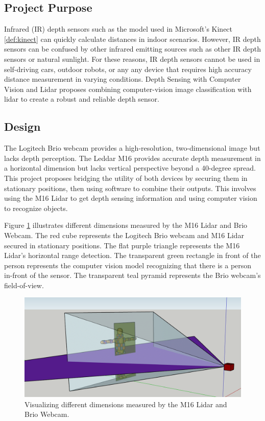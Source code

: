 \documentclass[onecolumn, draftclsnofoot,10pt, compsoc]{IEEEtran}
\makeatletter
\newcommand\captionof[1]{\def\@captype{#1}\caption}
\makeatother
\begin{document}
\begin{singlespace}
		
	\section{Project Purpose}
		Infrared (IR) depth sensors such as the model used in Microsoft's Kinect \ref{def:kinect} can quickly calculate distances in indoor scenarios.
		However, IR depth sensors can be confused by other infrared emitting sources such as other IR depth sensors or natural sunlight.
		For these reasons, IR depth sensors cannot be used in self-driving cars, outdoor robots, or any any device that requires high accuracy distance measurement in varying conditions.
		Depth Sensing with Computer Vision and Lidar proposes combining computer-vision image classification with lidar to create a robust and reliable depth sensor.

	\subsection{Design}
		The Logitech Brio webcam provides a high-resolution, two-dimensional image but lacks depth perception.
		The Leddar M16 provides accurate depth measurement in a horizontal dimension but lacks vertical perspective beyond a 40-degree spread.
		This project proposes bridging the utility of both devices by securing them in stationary positions, then using software to combine their outputs.
		This involves using the M16 Lidar to get depth sensing information and using computer vision to recognize objects.			


		Figure \ref{dimensions} illustrates different dimensions measured by the M16 Lidar and Brio Webcam.
		The red cube represents the Logitech Brio webcam and M16 Lidar secured in stationary positions.
		The flat purple triangle represents the M16 Lidar's horizontal range detection.
		The transparent green rectangle in front of the person represents the computer vision model recognizing that there is a person in-front of the sensor.
		The transparent teal pyramid represents the Brio webcam's field-of-view.
		
		\begin{figure}[H]
			\includegraphics[scale=0.5]{different_dimensions.PNG}
			\captionof{figure}{Visualizing different dimensions measured by the M16 Lidar and Brio Webcam.}
			\label{dimensions}
		\end{figure}



\end{singlespace}
\end{document}
